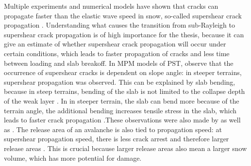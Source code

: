 \documentclass[10pt]{article}
\begin{document}
 Multiple experiments and numerical models have shown that cracks can propagate faster than the elastic wave speed in snow, so-called supershear crack propagation \parencite{trottetTransitionSubRayleighAnticrack2022,bobillierNumericalInvestigationCrack2024,bergfeldSignaturesSubRayleighSupershear2025}. Understanding what causes the transition from sub-Rayleigh to supershear crack propagation is of high importance for the thesis, because it can give an estimate of whether supershear crack propagation will occur under certain conditions, which leads to faster propagation of cracks and less time between loading and slab breakoff. In MPM models of PST, \cite{trottetTransitionSubRayleighAnticrack2022} observe that the occurrence of supershear cracks is dependent on slope angle: in steeper terrains, supershear propagation was observed. This can be explained by slab bending, because in steep terrains, bending of the slab is not limited to the collapse depth of the weak layer \parencite{trottetTransitionSubRayleighAnticrack2022}. In  in steeper terrain, the slab can bend more because of the terrain angle, the additional bending increases tensile stress in the slab, which leads to faster crack propagation \parencite{trottetTransitionSubRayleighAnticrack2022}.These observations were also made by \cite{bobillierNumericalInvestigationCrack2024} as well as \cite{bergfeldSignaturesSubRayleighSupershear2025}. The release area of an avalanche is also tied to propagation speed: at supershear propagation speed, there is less crack arrest and therefore larger release areas \parencite{trottetTransitionSubRayleighAnticrack2022,bergfeldSignaturesSubRayleighSupershear2025}. This is crucial because larger release areas also mean a larger snow volume, which has more potential for damage. \par
\end{document}
